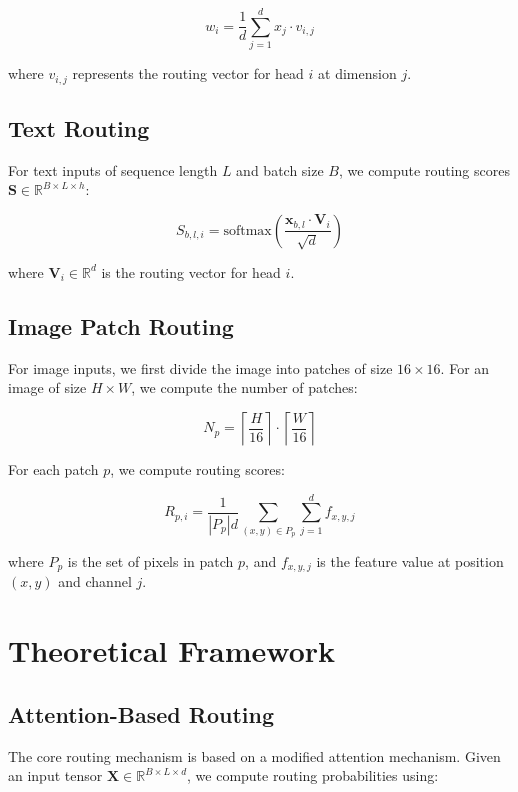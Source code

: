 \documentclass[10pt,journal,compsoc]{IEEEtran}
\begin{document}
\begin{equation}
    w_i = \frac{1}{d}\sum_{j=1}^d x_j \cdot v_{i,j}
\end{equation}

where $v_{i,j}$ represents the routing vector for head $i$ at dimension $j$.

\subsection{Text Routing}
For text inputs of sequence length $L$ and batch size $B$, we compute routing scores $\mathbf{S} \in \mathbb{R}^{B \times L \times h}$:

\begin{equation}
    S_{b,l,i} = \text{softmax}\left(\frac{\mathbf{x}_{b,l} \cdot \mathbf{V}_i}{\sqrt{d}}\right)
\end{equation}

where $\mathbf{V}_i \in \mathbb{R}^d$ is the routing vector for head $i$.

\subsection{Image Patch Routing}
For image inputs, we first divide the image into patches of size $16 \times 16$. For an image of size $H \times W$, we compute the number of patches:

\begin{equation}
    N_p = \left\lceil\frac{H}{16}\right\rceil \cdot \left\lceil\frac{W}{16}\right\rceil
\end{equation}

For each patch $p$, we compute routing scores:

\begin{equation}
    R_{p,i} = \frac{1}{|P_p|d}\sum_{(x,y) \in P_p}\sum_{j=1}^d f_{x,y,j}
\end{equation}

where $P_p$ is the set of pixels in patch $p$, and $f_{x,y,j}$ is the feature value at position $(x,y)$ and channel $j$.

\section{Theoretical Framework}
\subsection{Attention-Based Routing}
The core routing mechanism is based on a modified attention mechanism. Given an input tensor $\mathbf{X} \in \mathbb{R}^{B \times L \times d}$, we compute routing probabilities using:
\end{document}
